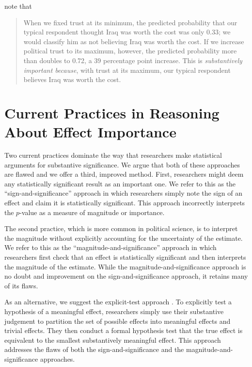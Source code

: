 \documentclass[12pt]{article}
\begin{document}
\citet[p. 317]{HetheringtonSuhay2011} note that 

\begin{quote}
When we fixed trust at its minimum, the predicted probability that our typical respondent thought Iraq was worth the cost was only 0.33; we would classify him as not believing Iraq was worth the cost. If we increase political trust to its maximum, however, the predicted probability more than doubles to 0.72, a 39 percentage point increase. This is \emph{substantively important because}, with trust at its maximum, our typical respondent believes Iraq was worth the cost.
\end{quote}


\section*{Current Practices in Reasoning About Effect Importance}

Two current practices dominate the way that researchers make statistical arguments for substantive significance. We argue that both of these approaches are flawed and we offer a third, improved method. First, researchers might deem any statistically significant result as an important one. We refer to this as the ``sign-and-significance'' approach in which researchers simply note the sign of an effect and claim it is statistically significant. This approach incorrectly interprets the $p$-value as a measure of magnitude or importance.

The second practice, which is more common in political science, is to interpret the magnitude without explicitly accounting for the uncertainty of the estimate. We refer to this as the ``magnitude-and-significance'' approach in which researchers first check that an effect is statistically significant and then interprets the magnitude of the estimate. While the magnitude-and-significance approach is no doubt and improvement on the sign-and-significance approach, it retains many of its flaws.

As an alternative, we suggest the explicit-test approach \citep{Gross2014}. To explicitly test a hypothesis of a meaningful effect, researchers simply use their substantive judgement to partition the set of possible effects into meaningful effects and trivial effects. They then conduct a formal hypothesis test that the true effect is equivalent to the smallest substantively meaningful effect. This approach addresses the flaws of both the sign-and-significance and the magnitude-and-significance approaches.
\end{document}
